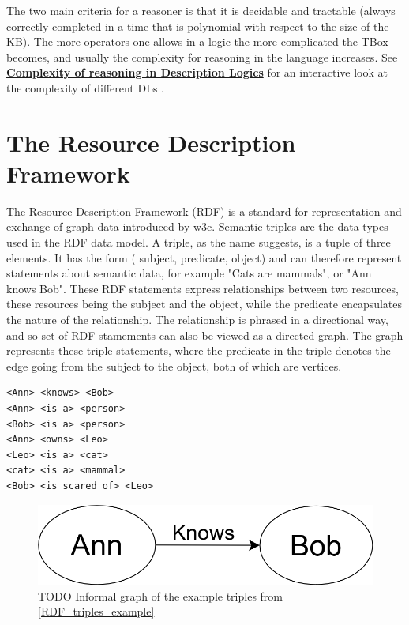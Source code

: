 The two main criteria for a reasoner is that it is decidable and tractable (always correctly completed in a time that is polynomial with respect to the size of the KB). The more operators one allows in a logic the more complicated the TBox becomes, and usually the complexity for reasoning in the language increases. See \href{http://www.cs.man.ac.uk/~ezolin/dl/}{\textbf{Complexity of reasoning in Description Logics}} for an interactive look at the complexity of different DLs \cite{zolin_2013}.

\section{The Resource Description Framework}

The Resource Description Framework (RDF) is a standard for representation and exchange of graph data introduced by \gls{w3c}. Semantic triples are the data types used in the RDF data model. A triple, as the name suggests, is a tuple of three elements. It has the form ( subject, predicate, object) and can therefore represent statements about semantic data, for example "Cats are mammals", or "Ann knows Bob". These RDF statements express relationships between two resources, these resources being the subject and the object, while the predicate encapsulates the nature of the relationship. The relationship is phrased in a directional way, and so set of RDF stamements can also be viewed as a directed graph. The graph represents these triple statements, where the predicate in the triple denotes the edge going from the subject to the object, both of which are vertices.

\begin{lstlisting}[caption={Example of RDF triple set written in informal pseudocode},label={RDF_triples_example}]
<Ann> <knows> <Bob>
<Ann> <is a> <person>
<Bob> <is a> <person>
<Ann> <owns> <Leo>
<Leo> <is a> <cat>
<cat> <is a> <mammal>
<Bob> <is scared of> <Leo>
\end{lstlisting}

\begin{figure}
\centering
    \includegraphics[scale=0.3]{figures/RDF_triple}
    \caption{TODO Informal graph of the example triples from \ref{RDF_triples_example}}
    
    \label{fig:KGexample}
\end{figure}

